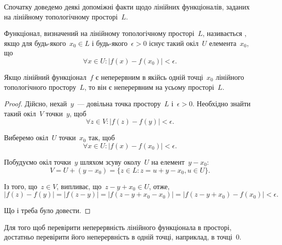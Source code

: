 Спочатку доведемо деякі допоміжні факти щодо лінійних функціоналів, заданих на лінійному топологічному просторі~$L$.

\begin{definition}
    Функціонал, визначений на лінійному топологічному просторі~$L$, називається , якщо для будь-якого~$x_0 \in L$ і будь-якого~$\epsilon > 0$ існує такий окіл~$U$ елемента~$x_0$, що
    \begin{equation*}
        \forall x \in U: |f(x) - f(x_0)| < \epsilon.
    \end{equation*}
\end{definition}

\begin{lemma}
    Якщо лінійний функціонал~$f$ є неперервним в якійсь одній точці~$x_0$ лінійного топологічного простору~$L$, то він є неперервним на усьому просторі~$L$.
\end{lemma}

\begin{proof}
    Дійсно, нехай~$y$~--- довільна точка простору~$L$ і~$\epsilon > 0$. Необхідно знайти такий окіл~$V$ точки~$y$, щоб
    \begin{equation*}
        \forall z \in V: |f(z) - f(y)| < \epsilon.
    \end{equation*}
    
    Виберемо окіл~$U$ точки~$x_0$ так, щоб
    \begin{equation*}
        \forall x \in U: |f(x) - f(x_0)| < \epsilon.
    \end{equation*}
    
    Побудуємо окіл точки~$y$ шляхом зсуву околу~$U$ на елемент~$y - x_0$:
    \begin{equation*}
        V = U + (y - x_0) = \{ z \in L: z = u + y - x_0, u \in U\}.
    \end{equation*}
    
    Із того, що~$z \in V$, випливає, що~$z - y + x_0 \in U$, отже,
    \begin{equation*}
        |f(z) - f(y)| = |f(z - y)| = |f(z - y + x_0 - x_0)| = |f(z - y + x_0) - f(x_0)| < \epsilon.
    \end{equation*}
    
    Що і треба було довести. 
\end{proof}

\begin{corollary}
    Для того щоб перевірити неперервність лінійного функціонала в просторі, достатньо перевірити його неперервність в одній точці, наприклад, в точці~$0$.
\end{corollary}

